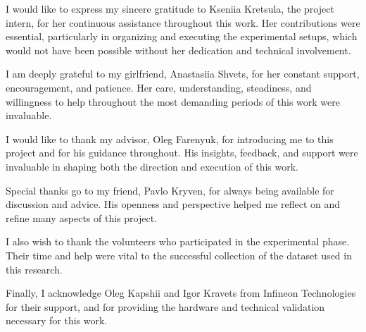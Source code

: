 \begin{acknowledgements}
\addchaptertocentry{\acknowledgementname}
\setlength{\parskip}{\baselineskip}

I would like to express my sincere gratitude to Kseniia Kretsula, the project intern, for her continuous assistance throughout this work. Her contributions were essential, particularly in organizing and executing the experimental setups, which would not have been possible without her dedication and technical involvement.

I am deeply grateful to my girlfriend, Anastasiia Shvets, for her constant support, encouragement, and patience. Her care, understanding, steadiness, and willingness to help throughout the most demanding periods of this work were invaluable.

I would like to thank my advisor, Oleg Farenyuk, for introducing me to this project and for his guidance throughout. His insights, feedback, and support were invaluable in shaping both the direction and execution of this work.

Special thanks go to my friend, Pavlo Kryven, for always being available for discussion and advice. His openness and perspective helped me reflect on and refine many aspects of this project.

I also wish to thank the volunteers who participated in the experimental phase. Their time and help were vital to the successful collection of the dataset used in this research.

Finally, I acknowledge Oleg Kapshii and Igor Kravets from Infineon Technologies for their support, and for providing the hardware and technical validation necessary for this work.

\end{acknowledgements}
